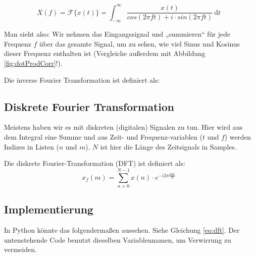 \begin{equation}
	X(f)= \mathcal{F} \{x(t)\} = \int_{-\infty}^\infty \! \frac{x(t)} { cos(2\pi ft)+i \cdot sin(2\pi ft) }  \, \mathrm{d}t
	\label{ft3}
\end{equation}

Man sieht also: Wir nehmen das Eingangssignal und „summieren“ für jede Frequenz $f$ über das gesamte Signal, um zu sehen, wie viel Sinus und Kosinus dieser Frequenz enthalten ist (Vergleiche außerdem mit Abbildung \ref{fig:dotProdCorr}!). 


Die inverse Fourier Transformation ist definiert als:


\subsection*{Diskrete Fourier Transformation}

Meistens haben wir es mit diskreten (digitalen) Signalen zu tun. Hier wird aus dem Integral eine Summe und aus Zeit- und Frequenz-variablen ($t$ und $f$) werden Indizes in Listen ($n$ und $m$). $N$ ist hier die Länge des Zeitsignals in Samples.




Die diskrete Fourier-Transformation (DFT) ist definiert als:
\begin{equation}
	x_f(m) = \sum_{n=0}^{N-1} x(n)\cdot e^{-i 2 \pi \frac{n m}{N} }
	\label{eq:dft}
\end{equation}

\subsection{Implementierung}

In Python könnte das folgendermaßen aussehen. Siehe Gleichung \ref{eq:dft}. Der untenstehende Code benutzt dieselben Variablennamen, um Verwirrung zu vermeiden.

